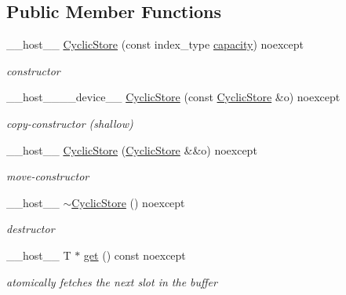 \subsection*{Public Member Functions}
\begin{DoxyCompactItemize}
\item 
\+\_\+\+\_\+host\+\_\+\+\_\+ \hyperlink{classwarpcore_1_1storage_1_1CyclicStore_aca834b00d59e653c092db712ca7eb7a0}{Cyclic\+Store} (const index\+\_\+type \hyperlink{classwarpcore_1_1storage_1_1CyclicStore_acc4bfbb9b10868a193301d0ec5a46711}{capacity}) noexcept
\begin{DoxyCompactList}\small\item\em constructor \end{DoxyCompactList}\item 
\+\_\+\+\_\+host\+\_\+\+\_\+\+\_\+\+\_\+device\+\_\+\+\_\+ \hyperlink{classwarpcore_1_1storage_1_1CyclicStore_a8c9f9193f3a45063b9b73fece142aa81}{Cyclic\+Store} (const \hyperlink{classwarpcore_1_1storage_1_1CyclicStore}{Cyclic\+Store} \&o) noexcept
\begin{DoxyCompactList}\small\item\em copy-\/constructor (shallow) \end{DoxyCompactList}\item 
\+\_\+\+\_\+host\+\_\+\+\_\+ \hyperlink{classwarpcore_1_1storage_1_1CyclicStore_a5657f1b2e0f9f7c8ee0de28d2c305cf0}{Cyclic\+Store} (\hyperlink{classwarpcore_1_1storage_1_1CyclicStore}{Cyclic\+Store} \&\&o) noexcept
\begin{DoxyCompactList}\small\item\em move-\/constructor \end{DoxyCompactList}\item 
\mbox{\label{classwarpcore_1_1storage_1_1CyclicStore_a4ccee1383c1d6434c49fae48a1e6c9c0}} 
\+\_\+\+\_\+host\+\_\+\+\_\+ \hyperlink{classwarpcore_1_1storage_1_1CyclicStore_a4ccee1383c1d6434c49fae48a1e6c9c0}{$\sim$\+Cyclic\+Store} () noexcept
\begin{DoxyCompactList}\small\item\em destructor \end{DoxyCompactList}\item 
\+\_\+\+\_\+host\+\_\+\+\_\+ T $\ast$ \hyperlink{classwarpcore_1_1storage_1_1CyclicStore_ab475e047f32b8a8358ea6b78dfe2536d}{get} () const noexcept
\begin{DoxyCompactList}\small\item\em atomically fetches the next slot in the buffer \end{DoxyCompactList}\item 

\end{DoxyCompactItemize}

